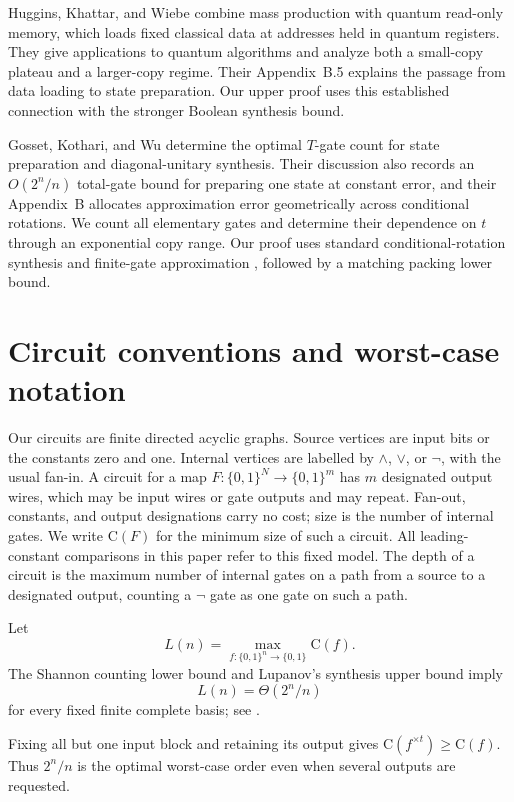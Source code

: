 \documentclass[11pt]{article}
\newcommand{\bits}{\{0,1\}}
\newcommand{\C}{\mathrm{C}}
\begin{document}
Huggins, Khattar, and Wiebe \cite{HugginsKhattarWiebe2025} combine mass
production with quantum read-only memory, which loads fixed classical
data at addresses held in quantum registers.  They give applications to
quantum algorithms and analyze both a small-copy plateau and a
larger-copy regime.  Their Appendix~B.5 explains the passage from data
loading to state preparation.  Our upper proof uses this established
connection with the stronger Boolean synthesis bound.

Gosset, Kothari, and Wu \cite{GossetKothariWu2026} determine the optimal
$T$-gate count for state preparation and diagonal-unitary synthesis.
Their discussion also records an $O(2^n/n)$ total-gate bound for preparing
one state at constant error, and their Appendix~B allocates approximation
error geometrically across conditional rotations.  We count all elementary
gates and determine their dependence on $t$ through an exponential copy
range.  Our proof uses standard conditional-rotation synthesis
\cite{ShendeBullockMarkov2006} and finite-gate approximation
\cite{DawsonNielsen2006}, followed by a matching packing lower bound.

\section{Circuit conventions and worst-case notation}\label{sec:conventions}

Our circuits are finite directed acyclic graphs.  Source vertices are input
bits or the constants zero and one.  Internal vertices are labelled by
$\wedge$, $\vee$, or $\neg$, with the usual fan-in.  A circuit for a map
$F:\bits^N\to\bits^m$ has $m$ designated output wires, which may be input
wires or gate outputs and may repeat.  Fan-out, constants, and output
designations carry no cost; size is the number of internal gates.  We write
$\C(F)$ for the minimum size of such a circuit.  All leading-constant
comparisons in this paper refer to this fixed model.  The depth of a circuit
is the maximum number of internal gates on a path from a source to a
designated output, counting a $\neg$ gate as one gate on such a path.

Let
\[
  L(n)=\max_{f:\bits^n\to\bits}\C(f).
\]
The Shannon counting lower bound and Lupanov's synthesis upper bound imply
\[
  L(n)=\Theta(2^n/n)
\]
for every fixed finite complete basis; see
\cite{Shannon1949,Lupanov1958,FrandsenMiltersen2005,Wegener1987}.

Fixing all but one input block and retaining its output gives
$\C(f^{\times t})\ge\C(f)$.  Thus $2^n/n$ is the optimal worst-case
order even when several outputs are requested.
\end{document}
